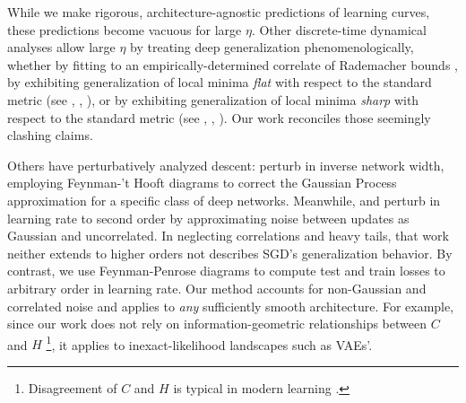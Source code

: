 \documentclass{article}
\theoremstyle{plain}
\theoremstyle{definition}
\begin{document}

    While we make rigorous, architecture-agnostic predictions of learning
    curves, these predictions become vacuous for large $\eta$.  Other
    discrete-time dynamical analyses allow large $\eta$ by treating deep
    generalization phenomenologically, whether by fitting to an
    empirically-determined correlate of Rademacher bounds \citep{li18}, by
    exhibiting generalization of local minima \emph{flat} with respect to the
    standard metric (see \citet{ho17}, \citet{ke17}, \citet{wa18}), or by
    exhibiting generalization of local minima \emph{sharp} with respect to the
    standard metric (see \citet{st56}, \citet{di17}, \citet{wu18}).  Our work
    reconciles those seemingly clashing claims.
    

    Others have perturbatively analyzed descent:  \citet{dy19} perturb
    in inverse network width, employing Feynman-'t Hooft diagrams to correct
    the Gaussian Process approximation for a specific class of deep networks.
    Meanwhile, \cite{ch18} and \citet{li17} perturb in learning rate to second
    order by approximating noise between updates as Gaussian and uncorrelated.
    In neglecting correlations and heavy tails, that work neither extends to
    higher orders not describes SGD's generalization behavior.
    By contrast, we use Feynman-Penrose diagrams to compute test and train
    losses to arbitrary order in learning rate.  Our method accounts for
    non-Gaussian and correlated noise and applies to \emph{any} sufficiently
    smooth architecture.  For example, since our work does not rely on
    information-geometric relationships between $C$ and $H$
    \citep{am98}\footnote{
        Disagreement of $C$ and $H$ is typical in modern learning \citep{ro12,
        ku19}.
    }, it applies to inexact-likelihood landscapes such as VAEs'. 

\end{document}
